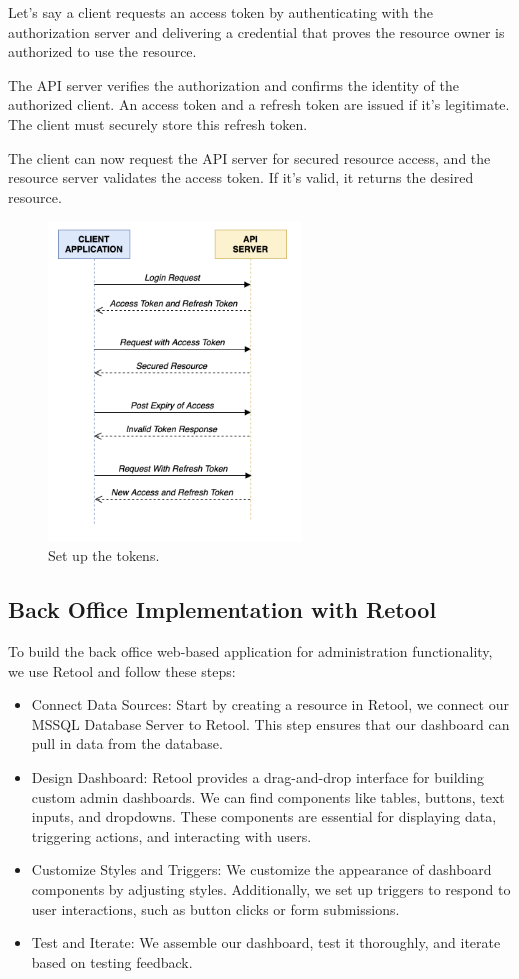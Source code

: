 Let’s say a client requests an access token by authenticating with the authorization server and delivering a credential that proves the resource owner is authorized to use the resource.

The API server verifies the authorization and confirms the identity of the authorized client. An access token and a refresh token are issued if it’s legitimate. The client must securely store this refresh token.

The client can now request the API server for secured resource access, and the resource server validates the access token. If it’s valid, it returns the desired resource.

\begin{figure}[H]
  \centering
  \includegraphics[width=0.6\textwidth]{Figures/Implementation/Tokens.png}
  \caption{Set up the tokens.}
  \label{fig:tokens-flow}
\end{figure}

\subsection{Back Office Implementation with Retool}
To build the back office web-based application for administration functionality, we use Retool and follow these steps:
\begin{itemize}
  \item Connect Data Sources: Start by creating a resource in Retool, we connect our MSSQL Database Server to Retool.
  This step ensures that our dashboard can pull in data from the database.
  \item Design Dashboard: Retool provides a drag-and-drop interface for building custom admin dashboards. 
  We can find components like tables, buttons, text inputs, and dropdowns. 
  These components are essential for displaying data, triggering actions, and interacting with users.
  \item Customize Styles and Triggers: We customize the appearance of dashboard components by adjusting styles. 
  Additionally, we set up triggers to respond to user interactions, such as button clicks or form submissions.
  \item Test and Iterate: We assemble our dashboard, test it thoroughly, and iterate based on testing feedback.
\end{itemize}

